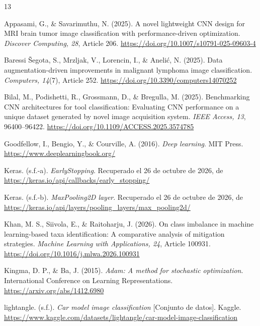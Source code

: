 \documentclass[conference]{IEEEtran}
\begin{document}
\begin{thebibliography}{13}

Appasami, G., \& Savarimuthu, N. (2025). A novel lightweight CNN design for MRI brain tumor image classification with performance-driven optimization. \textit{Discover Computing, 28}, Article 206. \url{https://doi.org/10.1007/s10791-025-09603-4}

Baressi \v{S}egota, S., Mrzljak, V., Lorencin, I., \& An\dj eli\'{c}, N. (2025). Data augmentation-driven improvements in malignant lymphoma image classification. \textit{Computers, 14}(7), Article 252. \url{https://doi.org/10.3390/computers14070252}

Bilal, M., Podishetti, R., Grossmann, D., \& Bregulla, M. (2025). Benchmarking CNN architectures for tool classification: Evaluating CNN performance on a unique dataset generated by novel image acquisition system. \textit{IEEE Access, 13}, 96400--96422. \url{https://doi.org/10.1109/ACCESS.2025.3574785}

Goodfellow, I., Bengio, Y., \& Courville, A. (2016). \textit{Deep learning}. MIT Press. \url{https://www.deeplearningbook.org/}

Keras. (s.f.-a). \textit{EarlyStopping}. Recuperado el 26 de octubre de 2026, de \url{https://keras.io/api/callbacks/early_stopping/}

Keras. (s.f.-b). \textit{MaxPooling2D layer}. Recuperado el 26 de octubre de 2026, de \url{https://keras.io/api/layers/pooling_layers/max_pooling2d/}

Khan, M. S., Siivola, E., \& Raitoharju, J. (2026). On class imbalance in machine learning-based taxa identification: A comparative analysis of mitigation strategies. \textit{Machine Learning with Applications, 24}, Article 100931. \url{https://doi.org/10.1016/j.mlwa.2026.100931}

Kingma, D. P., \& Ba, J. (2015). \textit{Adam: A method for stochastic optimization}. International Conference on Learning Representations. \url{https://arxiv.org/abs/1412.6980}

lightangle. (s.f.). \textit{Car model image classification} [Conjunto de datos]. Kaggle. \url{https://www.kaggle.com/datasets/lightangle/car-model-image-classification}


\end{thebibliography}
\end{document}
